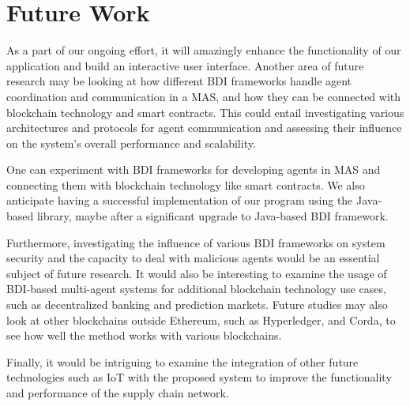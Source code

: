 {\chapter{Future Work}}

\label{sec:futurework}

As a part of our ongoing effort, it will amazingly enhance the functionality of our application and build an interactive user interface. Another area of future research may be looking at how different \ac{BDI} frameworks handle agent coordination and communication in a \ac{MAS}, and how they can be connected with blockchain technology and smart contracts. This could entail investigating various architectures and protocols for agent communication and assessing their influence on the system's overall performance and scalability.

\vspace{.5cm}

One can experiment with \ac{BDI} frameworks for developing agents in \ac{MAS} and connecting them with blockchain technology like smart contracts. We also anticipate having a successful implementation of our program using the Java-based library, maybe after a significant upgrade to Java-based \ac{BDI} framework.

\vspace{.5cm}

Furthermore, investigating the influence of various \ac{BDI} frameworks on system security and the capacity to deal with malicious agents would be an essential subject of future research. It would also be interesting to examine the usage of \ac{BDI}-based multi-agent systems for additional blockchain technology use cases, such as decentralized banking and prediction markets. Future studies may also look at other blockchains outside Ethereum, such as Hyperledger, and Corda, to see how well the method works with various blockchains.

\vspace{.5cm}

Finally, it would be intriguing to examine the integration of other future technologies such as \ac{IoT} with the proposed system to improve the functionality and performance of the supply chain network.